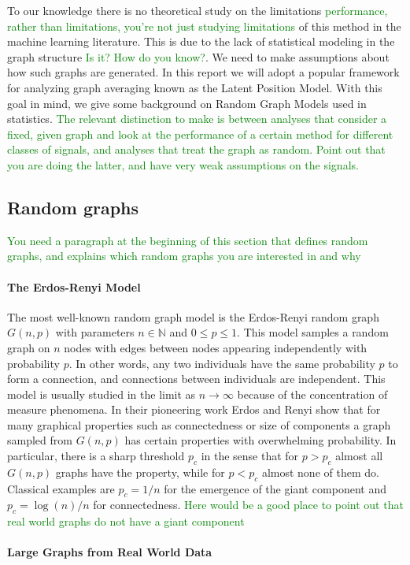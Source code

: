 \documentclass{article}
\newcommand\SB[1]{\textcolor{green}{#1}}
\begin{document}
To our knowledge there is no theoretical study on the limitations
\SB{performance, rather than limitations, you're not just studying limitations
}of this method in the machine learning literature. This is due to the lack of
statistical modeling in the graph structure \SB{Is it? How do you know?}. We
need to make assumptions about how such graphs are generated. In this report we
will adopt a popular framework for analyzing graph averaging known as the Latent
Position Model. With this goal in mind, we give some background on Random Graph
Models used in statistics.
\SB{The relevant distinction to make is between analyses that consider a fixed,
  given graph and look at the performance of a certain method for different
  classes of signals, and analyses that treat the graph as random. Point out
  that you are doing the latter, and have very weak assumptions on the signals.  }
\subsection{Random graphs}
\SB{You need a paragraph at the beginning of this section that defines random
  graphs, and explains which random graphs you are interested in and why}
\paragraph{The Erdos-Renyi Model}

The most well-known random graph model is the Erdos-Renyi random graph $G(n,p)$ with parameters $n\in\mathbb{N}$ and $0\leq p\leq 1$. This model samples a random graph on $n$ nodes with edges between nodes appearing independently with probability $p$. In other words, any two individuals have the same probability $p$ to form a connection, and connections between individuals are independent. This model is usually studied in the limit as $n\to\infty$ because of the concentration of measure phenomena. In their pioneering work Erdos and Renyi show that for many graphical properties such as connectedness or size of components a graph sampled from $G(n,p)$ has certain properties with overwhelming probability. In particular, there is a sharp threshold $p_c$ in the sense that for $p>p_c$ almost all $G(n,p)$ graphs have the property, while for $p<p_c$ almost none of them do. Classical examples are $p_c=1/n$ for the emergence of the giant component and $p_c=\log(n)/n$ for connectedness. 
\SB{Here would be a good place to point out that real world graphs do not have a
giant component}

\paragraph{Large Graphs from Real World Data}
\end{document}
